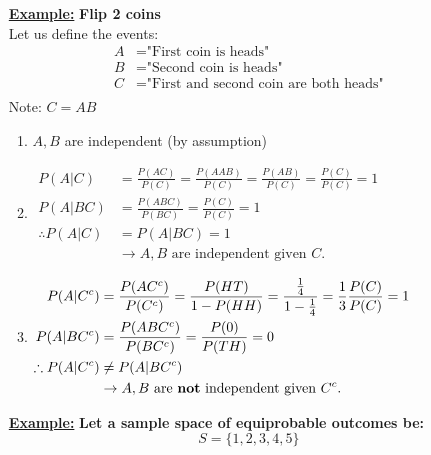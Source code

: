 \documentclass[10pt]{article}
\begin{document}
\begin{flushleft}
\begin{itemize}
    \item[\textbf{\underline{Example:}}] \textbf{Flip 2 coins} \\
        Let us define the events:
        $$ \begin{aligned}
            A &= \text{"First coin is heads"} \\
            B &= \text{"Second coin is heads"} \\
            C &= \text{"First and second coin are both heads"} \\
        \end{aligned} $$
        Note: $C = AB$
        \begin{enumerate}
            \item $A, B$ are independent (by assumption)
            \item $ \begin{aligned}
                    P(A|C) &= \frac{P(AC)}{P(C)} = \frac{P(AAB)}{P(C)} = \frac{P(AB)}{P(C)} =
                    \frac{P(C)}{P(C)} = 1 \\
                    P(A|BC) &= \frac{P(ABC)}{P(BC)} = \frac{P(C)}{P(C)} = 1 \\
                    \therefore P(A|C) &= P(A|BC) = 1 \\
                                      &\rightarrow A, B \text{ are independent given } C.
                \end{aligned} $
            \item $ \begin{aligned}
                    P(A|C^c) &= \frac{P(AC^c)}{P(C^c)} = \frac{P(HT)}{1 - P(HH)}
                    = \frac{\frac{1}{4}}{1 - \frac{1}{4}} = \frac{1}{3}
                    \frac{P(C)}{P(C)} = 1 \\
                    P(A|BC^c) &= \frac{P(ABC^c)}{P(BC^c)} = \frac{P(0)}{P(TH)} =
                    0\\
                    \therefore P(A|C^c) &\neq P(A|BC^c) \\
                                        &\rightarrow A, B \text{ are
                                        \textbf{not} independent given } C^c.
                \end{aligned} $
        \end{enumerate}
    \item[\textbf{\underline{Example:}}] \textbf{Let a sample space of
            equiprobable outcomes be:} \\
            $$ S = \{ 1, 2, 3, 4, 5 \} $$

\end{itemize}
\end{flushleft}
\end{document}
